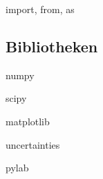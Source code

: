 \documentclass[t]{beamer}
\begin{document}
      \begin{frame}{import, from, as}
      \end{frame}
    
    \subsection{Bibliotheken}
      \begin{frame}{numpy}
      \end{frame}
      
      \begin{frame}{scipy}
      \end{frame}
      
      \begin{frame}{matplotlib}
      \end{frame}
      
      \begin{frame}{uncertainties}
      \end{frame}
      
      \begin{frame}{pylab}
      \end{frame}
\end{document}

